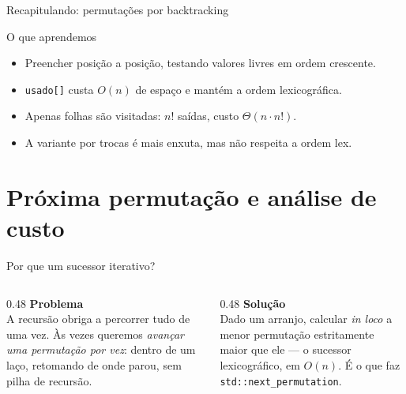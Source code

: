 \documentclass[aspectratio=169]{beamer}
\begin{document}
\begin{frame}{Recapitulando: permutações por backtracking}
  \begin{block}{O que aprendemos}
    \begin{itemize}
      \item Preencher posição a posição, testando valores livres em ordem crescente.
      \item \texttt{usado[]} custa $O(n)$ de espaço e mantém a ordem lexicográfica.
      \item Apenas folhas são visitadas: $n!$ saídas, custo $\Theta(n \cdot n!)$.
      \item A variante por trocas é mais enxuta, mas não respeita a ordem lex.
    \end{itemize}
  \end{block}
\end{frame}

\section{Próxima permutação e análise de custo}

\begin{frame}{Por que um sucessor iterativo?}
  \begin{columns}[T]
    \begin{column}{0.48\textwidth}
      \textbf{Problema}\\[2pt]
      A recursão obriga a percorrer tudo de uma vez. Às vezes queremos
      \emph{avançar uma permutação por vez}: dentro de um laço, retomando de
      onde parou, sem pilha de recursão.
    \end{column}
    \begin{column}{0.48\textwidth}
      \textbf{Solução}\\[2pt]
      Dado um arranjo, calcular \emph{in loco} a menor permutação
      estritamente maior que ele --- o sucessor lexicográfico, em $O(n)$.
      É o que faz \texttt{std::next\_permutation}.
    \end{column}
  \end{columns}
\end{frame}
\end{document}
